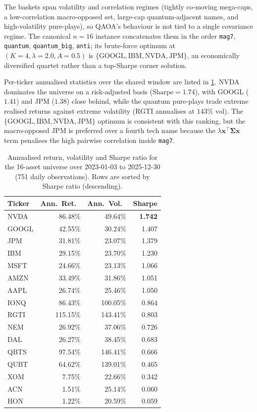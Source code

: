The baskets span volatility and correlation regimes (tightly co-moving mega-caps, a low-correlation macro-opposed set, large-cap quantum-adjacent names, and high-volatility pure-plays), so QAOA's behaviour is not tied to a single covariance regime. The canonical $n=16$ instance concatenates them in the order \texttt{mag7}, \texttt{quantum}, \texttt{quantum\_big}, \texttt{anti}; its brute-force optimum at $(K=4,\lambda=2.0,A=0.5)$ is $\{\text{GOOGL},\text{IBM},\text{NVDA},\text{JPM}\}$, an economically diversified quartet rather than a top-Sharpe corner solution.

Per-ticker annualised statistics over the shared window are listed in \cref{tab:assets}. NVDA dominates the universe on a risk-adjusted basis ($\mathrm{Sharpe}=1.74$), with GOOGL ($1.41$) and JPM ($1.38$) close behind, while the quantum pure-plays trade extreme realised returns against extreme volatility (RGTI annualises at $143\%$ vol). The $\{\text{GOOGL},\text{IBM},\text{NVDA},\text{JPM}\}$ optimum is consistent with this ranking, but the macro-opposed JPM is preferred over a fourth tech name because the $\lambda \boldsymbol{x}^\top\boldsymbol{\Sigma}\boldsymbol{x}$ term penalises the high pairwise correlation inside \texttt{mag7}.

\begin{table}[!t]
  \centering
  \small
  \caption{Annualised return, volatility and Sharpe ratio for the 16-asset universe over 2023-01-03 to 2025-12-30 (751 daily observations). Rows are sorted by Sharpe ratio (descending).}
  \label{tab:assets}
  \begin{tabular}{@{}lrrr@{}}
    \toprule
    Ticker & Ann.\ Ret.\ & Ann.\ Vol.\ & Sharpe \\
    \midrule
    NVDA  &  86.48\% &  49.64\% & \textbf{1.742} \\
    GOOGL &  42.55\% &  30.24\% & 1.407 \\
    JPM   &  31.81\% &  23.07\% & 1.379 \\
    IBM   &  29.15\% &  23.70\% & 1.230 \\
    MSFT  &  24.66\% &  23.13\% & 1.066 \\
    AMZN  &  33.49\% &  31.86\% & 1.051 \\
    AAPL  &  26.74\% &  25.46\% & 1.050 \\
    IONQ  &  86.43\% & 100.05\% & 0.864 \\
    RGTI  & 115.15\% & 143.41\% & 0.803 \\
    NEM   &  26.92\% &  37.06\% & 0.726 \\
    DAL   &  26.27\% &  38.45\% & 0.683 \\
    QBTS  &  97.54\% & 146.41\% & 0.666 \\
    QUBT  &  64.62\% & 139.01\% & 0.465 \\
    XOM   &   7.75\% &  22.66\% & 0.342 \\
    ACN   &   1.51\% &  25.14\% & 0.060 \\
    HON   &   1.22\% &  20.59\% & 0.059 \\
    \bottomrule
  \end{tabular}
\end{table}

